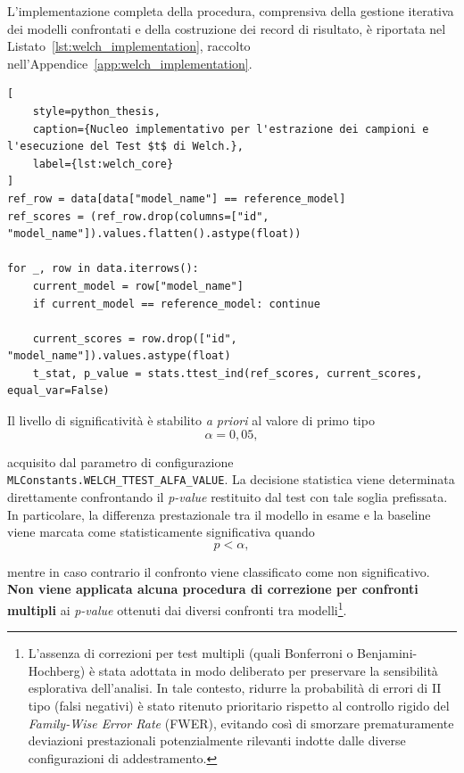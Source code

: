 L'implementazione completa della procedura, comprensiva della gestione iterativa dei modelli confrontati e della costruzione dei record di risultato, è riportata nel Listato~\ref{lst:welch_implementation}, raccolto nell'Appendice~\ref{app:welch_implementation}. 

\begin{lstlisting}[
    style=python_thesis,
    caption={Nucleo implementativo per l'estrazione dei campioni e l'esecuzione del Test $t$ di Welch.},
    label={lst:welch_core}
]
ref_row = data[data["model_name"] == reference_model]
ref_scores = (ref_row.drop(columns=["id", "model_name"]).values.flatten().astype(float))

for _, row in data.iterrows():
    current_model = row["model_name"]
    if current_model == reference_model: continue
    
    current_scores = row.drop(["id", "model_name"]).values.astype(float)
    t_stat, p_value = stats.ttest_ind(ref_scores, current_scores, equal_var=False)
\end{lstlisting}

Il livello di significatività è stabilito \textit{a priori} al valore di primo tipo
\begin{equation}
\alpha = 0{,}05,
\label{eq:welch_alpha}
\end{equation}

acquisito dal parametro di configurazione \texttt{MLConstants.WELCH\_TTEST\_ALFA\_VALUE}. 
La decisione statistica viene determinata direttamente confrontando il \textit{p-value} restituito dal test con tale soglia prefissata. 
In particolare, la differenza prestazionale tra il modello in esame e la baseline viene marcata come statisticamente significativa quando
\begin{equation}
p < \alpha,
\label{eq:welch_decision_rule}
\end{equation}

mentre in caso contrario il confronto viene classificato come non significativo. 
\textbf{Non viene applicata alcuna procedura di correzione per confronti multipli} ai \textit{p-value} ottenuti dai diversi confronti tra modelli\footnote{L'assenza di correzioni per test multipli (quali Bonferroni o Benjamini-Hochberg) è stata adottata in modo deliberato per preservare la sensibilità esplorativa dell'analisi. In tale contesto, ridurre la probabilità di errori di II tipo (falsi negativi) è stato ritenuto prioritario rispetto al controllo rigido del \textit{Family-Wise Error Rate} (FWER), evitando così di smorzare prematuramente deviazioni prestazionali potenzialmente rilevanti indotte dalle diverse configurazioni di addestramento.}.

